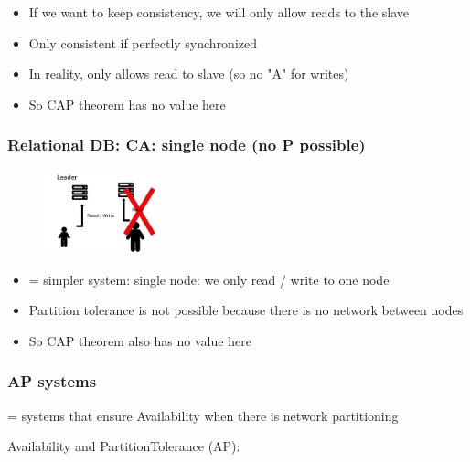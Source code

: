 \documentclass{article}
\begin{document}
\begin{itemize}
    \item If we want to keep consistency, we will only allow reads to the slave
    \item Only consistent if perfectly synchronized
    \item In reality, only allows read to slave (so no "A" for writes)
    \item So CAP theorem has no value here
\end{itemize}



\subsubsection{Relational DB: CA: single node (no P possible)}

\begin{figure}[H]
    \centering
    \includegraphics[width=0.3\textwidth]{cap-theorem-ca-single.png}
    \caption{}
\end{figure}

\begin{itemize}
    \item = simpler system: single node: we only read / write to one node
    \item Partition tolerance is not possible because there is no network between nodes
    \item So CAP theorem also has no value here
\end{itemize}

\subsubsection{AP systems}

= systems that ensure Availability when there is network partitioning

Availability and PartitionTolerance (AP):
\end{document}
